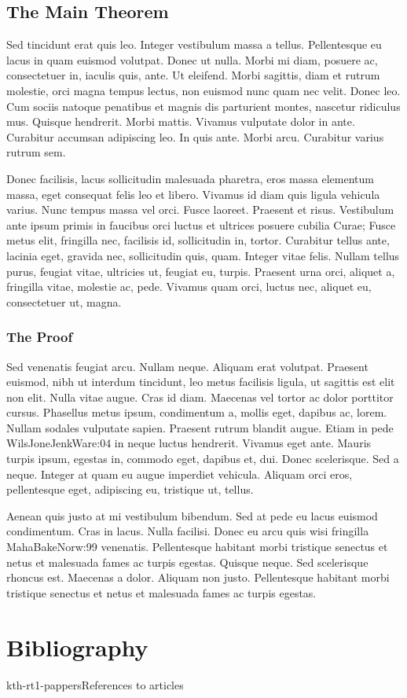 \documentclass[a4paper,11pt]{kth-mag}
\begin{document}
\section{The Main Theorem}

Sed tincidunt erat quis leo. Integer vestibulum massa a tellus.
Pellentesque eu lacus in quam euismod volutpat. Donec ut nulla. Morbi
mi diam, posuere ac, consectetuer in, iaculis quis, ante. Ut eleifend.
Morbi sagittis, diam et rutrum molestie, orci magna tempus lectus, non
euismod nunc quam nec velit. Donec leo. Cum sociis natoque penatibus
et magnis dis parturient montes, nascetur ridiculus mus. Quisque
hendrerit. Morbi mattis. Vivamus vulputate dolor in ante. Curabitur
accumsan adipiscing leo. In quis ante. Morbi arcu. Curabitur varius
rutrum sem.

Donec facilisis, lacus sollicitudin malesuada pharetra, eros massa
elementum massa, eget consequat felis leo et libero. Vivamus id diam
quis ligula vehicula varius. Nunc tempus massa vel orci. Fusce
laoreet. Praesent et risus. Vestibulum ante ipsum primis in faucibus
orci luctus et ultrices posuere cubilia Curae; Fusce metus elit,
fringilla nec, facilisis id, sollicitudin in, tortor. Curabitur tellus
ante, lacinia eget, gravida nec, sollicitudin quis, quam. Integer
vitae felis. Nullam tellus purus, feugiat vitae, ultricies ut, feugiat
eu, turpis. Praesent urna orci, aliquet a, fringilla vitae, molestie
ac, pede. Vivamus quam orci, luctus nec, aliquet eu, consectetuer ut,
magna.

\subsection{The Proof}

Sed venenatis feugiat arcu. Nullam neque. Aliquam erat volutpat.
Praesent euismod, nibh ut interdum tincidunt, leo metus facilisis
ligula, ut sagittis est elit non elit. Nulla vitae augue. Cras id
diam. Maecenas vel tortor ac dolor porttitor cursus. Phasellus metus
ipsum, condimentum a, mollis eget, dapibus ac, lorem. Nullam sodales
vulputate sapien. Praesent rutrum blandit augue. Etiam in pede \cite{kth-art}{WilsJoneJenkWare:04} in
neque luctus hendrerit. Vivamus eget ante. Mauris turpis ipsum,
egestas in, commodo eget, dapibus et, dui. Donec scelerisque. Sed a
neque. Integer at quam eu augue imperdiet vehicula. Aliquam orci eros,
pellentesque eget, adipiscing eu, tristique ut, tellus.

Aenean quis justo at mi vestibulum bibendum. Sed at pede eu lacus
euismod condimentum. Cras in lacus. Nulla facilisi. Donec eu arcu quis
wisi fringilla \cite{kth-art}{MahaBakeNorw:99} venenatis. Pellentesque habitant morbi tristique
senectus et netus et malesuada fames ac turpis egestas. Quisque neque.
Sed scelerisque rhoncus est. Maecenas a dolor. Aliquam non justo.
Pellentesque habitant morbi tristique senectus et netus et malesuada
fames ac turpis egestas.


\chapter{Bibliography}
{kth-rt1-pappers}{References to articles} 
\end{document}
